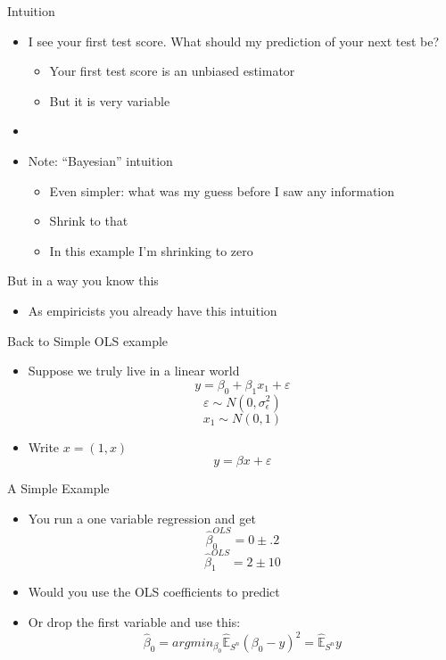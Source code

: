 \documentclass{beamer}
\begin{document}
\begin{frame}{Intuition}
	\begin{itemize}
		\item I see your first test score. What should my prediction of your next test be?
		\begin{itemize}
			\item Your first test score is an unbiased estimator 
			\item But it is very variable
		\end{itemize}
		\item[]
		\item Note: “Bayesian” intuition
		\begin{itemize}
			\item Even simpler: what was my guess before I saw any information
			\item Shrink to that
			\item In this example I’m shrinking to zero
		\end{itemize}
	\end{itemize}
\end{frame}

\begin{frame}{But in a way you know this}
	\begin{itemize}
		\item As empiricists you already have this intuition		
	\end{itemize}
\end{frame}

\begin{frame}{Back to Simple OLS example}
	\begin{itemize}
		\item Suppose we truly live in a linear world
		$$y=\beta_0+\beta_1x_1+\varepsilon$$
		$$\varepsilon\sim N(0,\sigma_\epsilon^2)$$
		$$x_1\sim N(0,1)$$
		\item Write $x=(1,x)$
		$$y=\beta x+\varepsilon$$
	\end{itemize}
\end{frame}

\begin{frame}{A Simple Example}
	\begin{itemize}
		\item You run a one variable regression and get
		$$\hat{\beta}_0^{OLS}=0\pm.2$$
		$$\hat{\beta}_1^{OLS}=2\pm10$$
		\item Would you use the OLS coefficients to predict
		\item Or drop the first variable and use this:
		$$\hat{\beta}_0=argmin_{\beta_0}\hat{\mathbb{E}}_{S^n}(\beta_0-y)^2=\hat{\mathbb{E}}_{S^n}y$$
	\end{itemize}
\end{frame}
\end{document}
